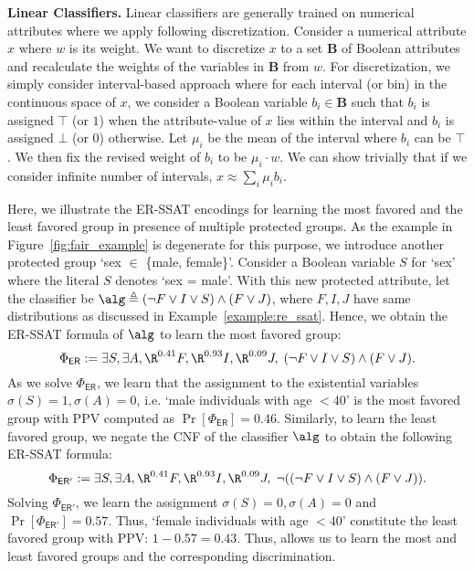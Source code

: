 \textbf{Linear Classifiers.} Linear classifiers are generally trained on numerical attributes where we apply following discretization. Consider a numerical attribute $ x $ where $ w $ is its weight. We want to discretize $ x $ to a set $ \mathbf{B} $ of Boolean attributes and recalculate the weights of the variables in $ \mathbf{B} $ from $ w $. For discretization, we simply consider interval-based approach where for each interval (or bin) in the continuous space of $ x $, we consider a Boolean variable $ b_i \in \mathbf{B} $ such that $ b_i $ is assigned $ \top $ (or $ 1 $) when the attribute-value of $ x $ lies within the interval and $ b_i $ is assigned $ \bot $ (or $ 0 $) otherwise. Let $ \mu_i $ be the mean of the interval where  $ b_i $ can be $ \top $. We then fix the revised weight of $ b_i $ to be $ \mu_i\cdot w $. We can show trivially that if we consider infinite number of intervals, $ x \approx \sum_i \mu_ib_i $. 


\begin{example}
	\label{example:er_ssat}
	Here, we illustrate the ER-SSAT encodings for learning the most favored and the least favored group in presence of multiple protected groups. As the example in Figure~\ref{fig:fair_example} is degenerate for this purpose, we introduce another protected group `sex $ \in $ \{male, female\}'. Consider a Boolean variable $ S $ for `sex' where the literal $ S $ denotes `sex = male'. With this new protected attribute, let the classifier be  $\alg \triangleq (\neg F \vee I \vee S) \wedge (F \vee J)$, where $ F,I,J $ have same distributions as discussed in Example~\ref{example:re_ssat}. 
	Hence, we obtain the ER-SSAT formula of $\alg$ to learn the most favored group:
	\begin{equation}
	\Phi_{\mathsf{ER}} :=  \exists S,\exists A, \R^{0.41}F, \R^{0.93}I, \R^{0.09}J, \; (\neg F \vee I \vee S) \wedge (F \vee J).\notag
	\end{equation}
	As we solve $ \Phi_{\mathsf{ER}} $, we learn that the assignment to the existential variables $ \sigma(S) = 1, \sigma(A) = 0$, i.e. `male individuals with age $ < 40 $' is the most favored group with PPV computed as $ \Pr[\Phi_{\mathsf{ER}}] = 0.46$. Similarly, to learn the least favored group, we negate the CNF of the classifier $\alg$ to obtain the following ER-SSAT formula:
	\begin{equation}
	\Phi_{\mathsf{ER'}} :=  \exists S, \exists A, \R^{0.41}F, \R^{0.93}I, \R^{0.09}J, \; \neg((\neg F \vee I \vee S) \wedge (F \vee J)).\notag
	\end{equation}
	Solving $ \Phi_{\mathsf{ER'}} $, we learn the assignment $ \sigma(S) = 0, \sigma(A) = 0  $ and $  \Pr[\Phi_{\mathsf{ER'}}] = 0.57 $. Thus, `female individuals with age $ < 40 $' constitute the least favored group with PPV:  $ 1-0.57 = 0.43$. 
	Thus, {\frameworklearn} allows us to learn the most and least favored groups and the corresponding discrimination.
\end{example}

